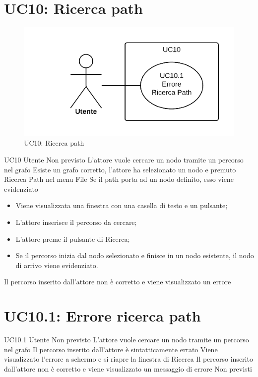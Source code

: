 \documentclass[../AnalisideiRequisiti.tex]{subfiles}
\begin{document}
\section{UC10: Ricerca path}
\begin{figure}[H]
	\centering
	\includegraphics[width=\textwidth]{../img/UC10.png}
	\caption{UC10: Ricerca path}
\end{figure}
\UserCase
{UC10}
{Utente}
{Non previsto}
{L'attore vuole cercare un nodo tramite un percorso nel grafo}
{Esiste un grafo corretto, l'attore ha selezionato un nodo e premuto Ricerca Path nel menu File}
{Se il path porta ad un nodo definito, esso viene evidenziato}
{
	\begin{itemize}
		\item{} Viene visualizzata una finestra con una casella di testo e un pulsante;
		\item{} L'attore inserisce il percorso da cercare;
		\item{} L'attore preme il pulsante di Ricerca;
		\item{} Se il percorso inizia dal nodo selezionato e finisce in un nodo esistente, il nodo di arrivo viene evidenziato.
 	\end{itemize}
}
{Il percorso inserito dall'attore non è corretto e viene visualizzato un errore }

\section{UC10.1: Errore ricerca path}
\UserCase
{UC10.1}
{Utente}
{Non previsto}
{L'attore vuole cercare un nodo tramite un percorso nel grafo}
{Il percorso inserito dall'attore è sintatticamente errato}
{Viene visualizzato l'errore a schermo e si riapre la finestra di Ricerca }
{Il percorso inserito dall'attore non è corretto e viene visualizzato un messaggio di errore}
{Non previsti}
\end{document}
